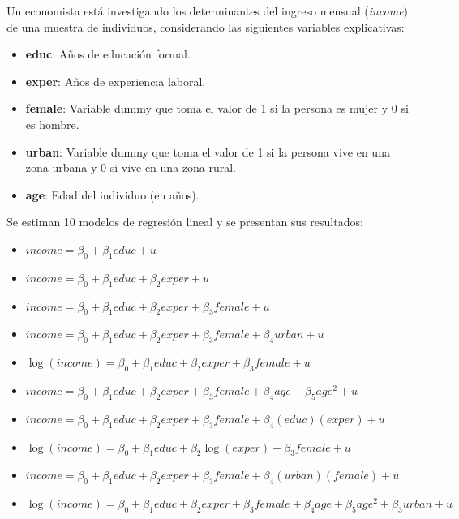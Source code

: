 \documentclass[12pt]{article}
\begin{document}
Un economista está investigando los determinantes del ingreso mensual (\textit{income}) de una muestra de individuos, considerando las siguientes variables explicativas:

\begin{itemize}
    \item \textbf{educ}: Años de educación formal.
    \item \textbf{exper}: Años de experiencia laboral.
    \item \textbf{female}: Variable dummy que toma el valor de 1 si la persona es mujer y 0 si es hombre.
    \item \textbf{urban}: Variable dummy que toma el valor de 1 si la persona vive en una zona urbana y 0 si vive en una zona rural.
    \item \textbf{age}: Edad del individuo (en años).
\end{itemize}

Se estiman 10 modelos de regresión lineal y se presentan sus resultados:

\begin{itemize}
    \item $income = \beta_{0} + \beta_{1}educ + u$
    \item $income = \beta_{0} + \beta_{1}educ + \beta_{2}exper + u$
    \item $income = \beta_{0} + \beta_{1}educ + \beta_{2}exper + \beta_{3}female + u$
    \item $income = \beta_{0} + \beta_{1}educ + \beta_{2}exper + \beta_{3}female + \beta_{4}urban + u$
    \item $\log(income) = \beta_{0} + \beta_{1}educ + \beta_{2}exper + \beta_{3}female + u$
    \item $income = \beta_{0} + \beta_{1}educ + \beta_{2}exper + \beta_{3}female + \beta_{4}age + \beta_{5}age^{2} + u$
    \item $income = \beta_{0} + \beta_{1}educ + \beta_{2}exper + \beta_{3}female + \beta_{4}(educ)(exper) + u$
    \item $\log(income) = \beta_{0} + \beta_{1}educ + \beta_{2}\log(exper) + \beta_{3}female + u$
    \item $income = \beta_{0} + \beta_{1}educ + \beta_{2}exper + \beta_{3}female + \beta_{4}(urban)(female) + u$
    \item $\log(income) = \beta_{0} + \beta_{1}educ + \beta_{2}exper + \beta_{3}female + \beta_{4}age + \beta_{5}age^{2} + \beta_{3}urban + u$
\end{itemize}
\end{document}
